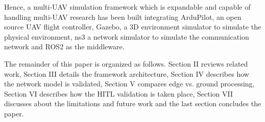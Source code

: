 Hence, a multi-UAV simulation framework which is expandable and capable of handling multi-UAV research has been built integrating ArduPilot, an open source UAV flight controller, Gazebo, a 3D environment simulator to simulate the physical environment, ns3 a network simulator to simulate the communication network and ROS2 as the middleware.

The remainder of this paper is organized as follows. Section II reviews related work, Section III details the framework architecture, Section IV describes how the network model is validated, Section V compares edge vs. ground processing, Section VI describes how the HITL validation is taken place, Section VII discusses about the limitations and future work and the last section concludes the paper.

